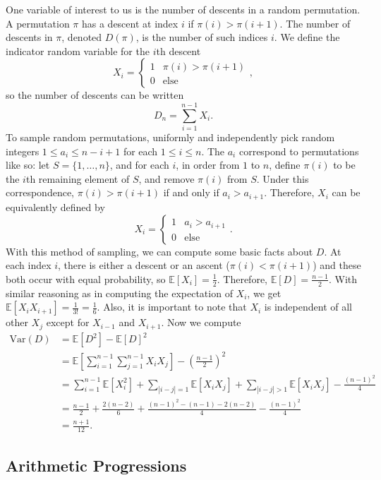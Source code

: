 \documentclass[12pt]{article} %
\newcommand{\f}[2]{\frac{#1}{#2}}
\newcommand{\p}[1]{\left(#1\right)}
\newcommand{\s}[1]{\left[#1\right]}
\newcommand{\abs}[1]{\left\lvert#1\right\rvert}
\newcommand{\Var}{\mathrm{Var}}
\newcommand{\E}{\mathbb{E}}
\theoremstyle{definition}
\theoremstyle{remark}
\begin{document}
One variable of interest to us is the number of descents in a random permutation. A permutation $\pi$ has a descent at index $i$ if $\pi(i) > \pi(i+1)$. The number of descents in $\pi$, denoted $D(\pi)$, is the number of such indices $i$. We define the indicator random variable for the $i$th descent
\[ X_i = \begin{cases} 1 & \pi(i) > \pi(i+1) \\ 0 & \text{else} \end{cases}, \]
so the number of descents can be written
\[ D_n = \sum_{i=1}^{n-1} X_i. \]
To sample random permutations, uniformly and independently pick random integers $1 \leq a_i \leq n - i + 1$ for each $1 \leq i \leq n$. The $a_i$ correspond to permutations like so: let $S = \{1, \ldots, n\}$, and for each $i$, in order from $1$ to $n$, define $\pi(i)$ to be the $i$th remaining element of $S$, and remove $\pi(i)$ from $S$. Under this correspondence, $\pi(i) > \pi(i+1)$ if and only if $a_i > a_{i+1}$. Therefore, $X_i$ can be equivalently defined by
\[ X_i = \begin{cases} 1 & a_i > a_{i+1} \\ 0 & \text{else} \end{cases}. \]
	With this method of sampling, we can compute some basic facts about $D$. At each index $i$, there is either a descent or an ascent ($\pi(i) < \pi(i+1)$) and these both occur with equal probability, so $\E[X_i] = \f{1}{2}$. Therefore, $\E[D] = \f{n-1}{2}$. With similar reasoning as in computing the expectation of $X_i$, we get $\E[X_i X_{i+1}] = \f{1}{3!} = \f{1}{6}$. Also, it is important to note that $X_i$ is independent of all other $X_j$ except for $X_{i-1}$ and $X_{i+1}$. Now we compute
\begin{align*}
	\Var(D)
	&= \E[D^2] - \E[D]^2 \\
	&= \E\s{\sum_{i=1}^{n-1} \sum_{j=1}^{n-1} X_i X_j} - \p{\f{n-1}{2}}^2 \\
	&= \sum_{i=1}^{n-1} \E[X_i^2] + \sum_{\abs{i-j} = 1} \E[X_i X_j] + \sum_{\abs{i-j} > 1} \E[X_i X_j] - \f{(n-1)^2}{4} \\
	&= \f{n-1}{2} + \f{2(n-2)}{6} + \f{(n-1)^2 - (n-1) - 2(n-2)}{4} - \f{(n-1)^2}{4} \\
	&= \f{n+1}{12}.
\end{align*}

\subsection{Arithmetic Progressions}
\end{document}
